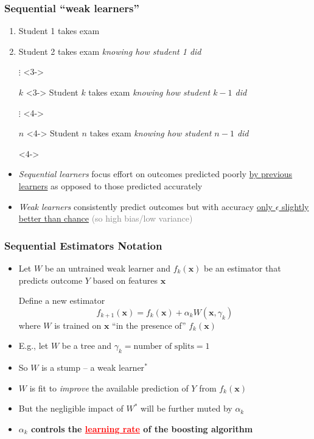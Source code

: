 \documentclass[xcolor={dvipsnames}]{beamer}
\begin{document}
\frame
{
 \frametitle{Sequential ``weak learners''}

\begin{enumerate}
\item<1-> Student 1 takes exam
\item<2-> Student 2 takes exam \emph{knowing how student 1 did}
\item[$\vdots$]<3-> 
\item[$k$]<3-> Student $k$ takes exam \emph{knowing how student $k-1$ did}
\item[$\vdots$]<4-> 
\item[$n$]<4-> Student $n$ takes exam \emph{knowing how student $n-1$ did}
\item[]<4-> 
\end{enumerate}

\begin{itemize}
\item<5-> \emph{Sequential learners} focus effort on outcomes predicted poorly 
\underline{by previous learners} as opposed to those predicted accurately 
\item[]
\item<6-> \emph{Weak learners} consistently predict outcomes but with  accuracy \underline{only $\epsilon$ slightly better than chance} \textcolor{gray}{(so high bias/low variance)}   
\end{itemize}

\begin{figure}
\centering
{}

\end{figure}
}


\frame
{
 \frametitle{Sequential Estimators Notation}

\begin{itemize}
\item Let $W$ be an untrained weak learner and $f_k({\boldsymbol x})$ be 
an estimator that predicts outcome $Y$ based on features ${\boldsymbol x}$ 
\item[]
\item[] Define a new estimator  
$$f_{k+1}({\boldsymbol x}) = f_k({\boldsymbol x}) + \alpha_k W({\boldsymbol x}, \gamma_k)$$ 
where $W$ is trained on ${\boldsymbol x}$ ``in the 
presence of'' $f_k({\boldsymbol x})$

\item[]
\item<2-> E.g., let $W$ be a tree and $\gamma_k = \text{number of splits} = 1$
\item<3->[] So $W$ is a stump -- a weak learner$^*$
\item<4-> $W$ is fit to \emph{improve} the available prediction of $Y$ from $f_k({\boldsymbol x})$  
\item<5-> But the negligible impact of $W^*$ will be further muted by $\alpha_k$
\item<5-> \textbf{$\alpha_k$ controls the \textcolor{red}{\underline{learning rate}} of the boosting algorithm}
\end{itemize}
}
\end{document}
